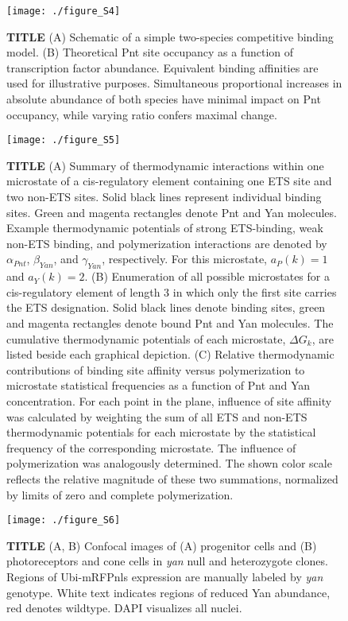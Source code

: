 \begin{figure}[h]
\centering
\texttt{[image: ./figure\_S4]}
\caption[TITLE]{\textbf{TITLE} (A) Schematic of a simple two-species competitive binding model. (B) Theoretical Pnt site occupancy as a function of transcription factor abundance. Equivalent binding affinities are used for illustrative purposes. Simultaneous proportional increases in absolute abundance of both species have minimal impact on Pnt occupancy, while varying ratio confers maximal change.}
\label{fig:ch2:figS4}
\end{figure}

\begin{figure}[h]
\centering
\texttt{[image: ./figure\_S5]}
\caption[TITLE]{\textbf{TITLE} (A) Summary of thermodynamic interactions within one microstate of a cis-regulatory element containing one ETS site and two non-ETS sites. Solid black lines represent individual binding sites. Green and magenta rectangles denote Pnt and Yan molecules. Example thermodynamic potentials of strong ETS-binding, weak non-ETS binding, and polymerization interactions are denoted by $\alpha_{Pnt}$, $\beta_{Yan}$, and $\gamma_{Yan}$, respectively. For this microstate, $a_P(k)=1$ and $a_Y(k)=2$. (B) Enumeration of all possible microstates for a cis-regulatory element of length 3 in which only the first site carries the ETS designation. Solid black lines denote binding sites, green and magenta rectangles denote bound Pnt and Yan molecules. The cumulative thermodynamic potentials of each microstate, $\Delta G_k$, are listed beside each graphical depiction. (C) Relative thermodynamic contributions of binding site affinity versus polymerization to microstate statistical frequencies as a function of Pnt and Yan concentration. For each point in the plane, influence of site affinity was calculated by weighting the sum of all ETS and non-ETS thermodynamic potentials for each microstate by the statistical frequency of the corresponding microstate. The influence of polymerization was analogously determined. The shown color scale reflects the relative magnitude of these two summations, normalized by limits of zero and complete polymerization.}
\label{fig:ch2:figS5}
\end{figure}

\begin{figure}[h]
\centering
\texttt{[image: ./figure\_S6]}
\caption[TITLE]{\textbf{TITLE} (A, B) Confocal images of (A) progenitor cells and (B) photoreceptors and cone cells in \textit{yan} null and heterozygote clones. Regions of Ubi-mRFPnls expression are manually labeled by \textit{yan} genotype. White text indicates regions of reduced Yan abundance, red denotes wildtype. DAPI visualizes all nuclei.}
\label{fig:ch2:figS6}
\end{figure}

